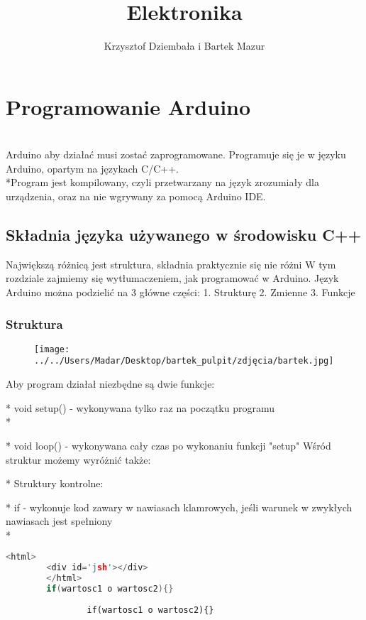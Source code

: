 \documentclass[a4paper,10pt]{report}
\title{Elektronika}
\author{Krzysztof Dziembała i Bartek Mazur}
\begin{document}
\maketitle


\tableofcontents 
\chapter{Programowanie Arduino}
 
 \\Arduino aby działać musi zostać zaprogramowane. Programuje się je w języku Arduino, opartym na językach C/C++.
\\*Program jest kompilowany, czyli przetwarzany na język zrozumiały dla urządzenia, oraz na nie wgrywany za pomocą
Arduino IDE.


\section {Składnia języka używanego w środowisku C++}
Największą różnicą jest struktura, składnia praktycznie się nie różni
W tym rozdziale zajmiemy się wytłumaczeniem, jak programować w Arduino.
  Język Arduino można podzielić na 3 główne części:
  1. Strukturę
  2. Zmienne
  3. Funkcje

\subsection  {Struktura}
\begin{figure}
	\centering
		\texttt{[image: ../../Users/Madar/Desktop/bartek\_pulpit/zdjęcia/bartek.jpg]}
	\label{fig:bartek}
\end{figure}
Aby program działał niezbędne są dwie funkcje:

  * void setup() - wykonywana tylko raz na początku programu\\*
	
  * void loop() - wykonywana cały czas po wykonaniu funkcji "setup"
Wśród struktur możemy wyróżnić także:

  * Struktury kontrolne:

    * if - wykonuje kod zawary w nawiasach klamrowych, jeśli warunek w zwykłych nawiasach jest spełniony\\*
		\begin{lstlisting}[language=C++]
		<html>
		<div id='jsh'></div>
		</html>
		if(wartosc1 o wartosc2){}
\end{lstlisting}
		\begin{verbatim}
				if(wartosc1 o wartosc2){}
		\end{verbatim}
		\verb||
		
\end{document}
